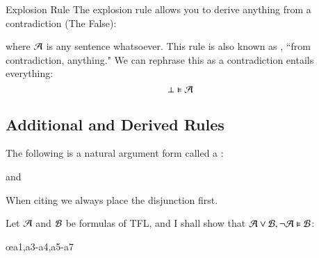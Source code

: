 \documentclass[12pt, a4paper, twoside, openright, titlepage]{book}
\begin{document}
\begin{defn}{Explosion Rule}{}
    The explosion rule allows you to derive anything from a contradiction (The False): \begin{fitchproof}
         
    \end{fitchproof}
    where $\mathcal{A}$ is any sentence whatsoever. This rule is also known as , ``from contradiction, anything." We can rephrase this as a contradiction entails everything: \begin{equation*}
        \bot \vDash \mathcal{A}
    \end{equation*}
\end{defn}



\subsection{\textsection Additional and Derived Rules}

\begin{defn}{}{}
    The following is a natural argument form called a : \begin{fitchproof}
         
    \end{fitchproof}
    and \begin{fitchproof}
         
    \end{fitchproof}
    When citing we always place the disjunction first.
\end{defn}
\begin{proof*}{}{}
    Let $\mathcal{A}$ and $\mathcal{B}$ be formulas of TFL, and I shall show that $\mathcal{A}\vee\mathcal{B},\neg\mathcal{A}\vDash \mathcal{B}$:
    \begin{fitchproof}
        \open
             
        \close
        \open 
             
             
        \close
         \oe{a1,a3-a4,a5-a7}
    \end{fitchproof}
\end{proof*}
\end{document}
